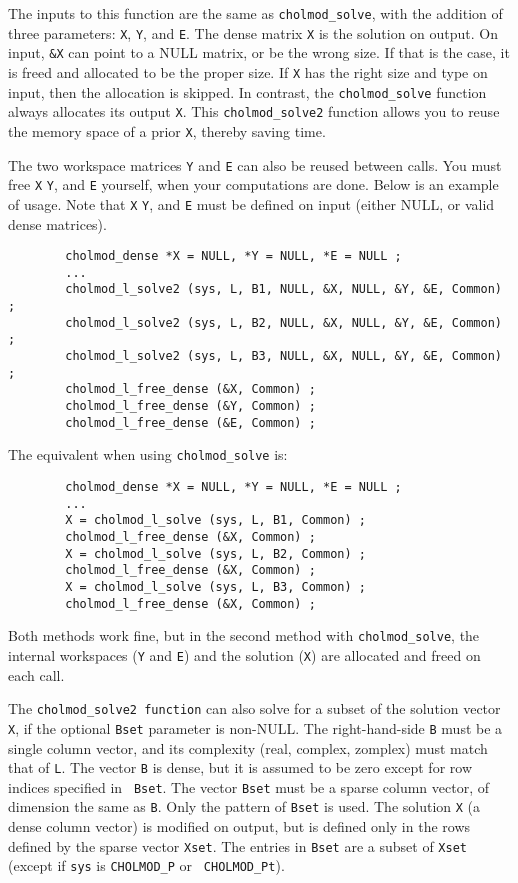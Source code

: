 \documentclass[11pt]{article}
\begin{document}
The inputs to this function are the same as {\tt cholmod\_solve},
with the addition of three parameters:
{\tt X},
{\tt Y},
and
{\tt E}.  The dense matrix {\tt X} is the solution on output.
On input, {\tt \&X} can point to a NULL matrix, or be the wrong size.
If that is the case, it is freed and allocated to be the proper size. 
If {\tt X} has the right size and type on input, then the allocation
is skipped.  In contrast, the {\tt cholmod\_solve} function always
allocates its output {\tt X}.  This {\tt cholmod\_solve2} function
allows you to reuse the memory space of a prior {\tt X}, thereby
saving time.

The two workspace matrices {\tt Y} and {\tt E} can also be reused
between calls.
You must free
{\tt X}
{\tt Y},
and 
{\tt E} yourself, when your computations are done.  Below is an
example of usage.
Note that 
{\tt X}
{\tt Y},
and 
{\tt E} must be defined on input (either NULL, or valid dense matrices).

\begin{verbatim}
        cholmod_dense *X = NULL, *Y = NULL, *E = NULL ;
        ...
        cholmod_l_solve2 (sys, L, B1, NULL, &X, NULL, &Y, &E, Common) ;
        cholmod_l_solve2 (sys, L, B2, NULL, &X, NULL, &Y, &E, Common) ;
        cholmod_l_solve2 (sys, L, B3, NULL, &X, NULL, &Y, &E, Common) ;
        cholmod_l_free_dense (&X, Common) ;
        cholmod_l_free_dense (&Y, Common) ;
        cholmod_l_free_dense (&E, Common) ;
\end{verbatim}

The equivalent when using {\tt cholmod\_solve} is:

\begin{verbatim}
        cholmod_dense *X = NULL, *Y = NULL, *E = NULL ;
        ...
        X = cholmod_l_solve (sys, L, B1, Common) ;
        cholmod_l_free_dense (&X, Common) ;
        X = cholmod_l_solve (sys, L, B2, Common) ;
        cholmod_l_free_dense (&X, Common) ;
        X = cholmod_l_solve (sys, L, B3, Common) ;
        cholmod_l_free_dense (&X, Common) ;
\end{verbatim}

Both methods work fine, but in the second method with {\tt cholmod\_solve},
the internal workspaces ({\tt Y} and {\tt E}) and the solution ({\tt X})
are allocated and freed on each call.

The {\tt cholmod\_solve2 function} can also solve for a subset of the solution
vector {\tt X}, if the optional {\tt Bset} parameter is non-NULL.  The
right-hand-side {\tt B} must be a single column vector, and its complexity
(real, complex, zomplex) must match that of {\tt L}.  The vector {\tt B} is
dense, but it is assumed to be zero except for row indices specified in {\tt
Bset}.  The vector {\tt Bset} must be a sparse column vector, of dimension the
same as {\tt B}.  Only the pattern of {\tt Bset} is used.  The solution {\tt X}
(a dense column vector) is modified on output, but is defined only in the rows
defined by the sparse vector {\tt Xset}.  The entries in {\tt Bset} are a
subset of {\tt Xset} (except if {\tt sys} is {\tt CHOLMOD\_P} or {\tt
CHOLMOD\_Pt}).
\end{document}
